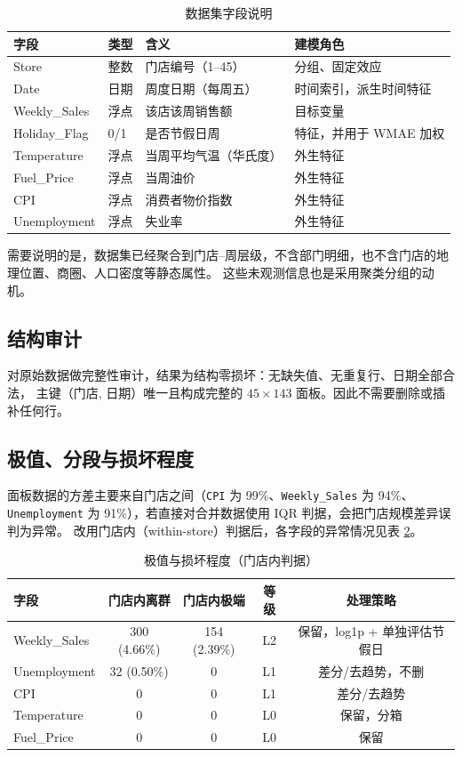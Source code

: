 \documentclass[UTF8,a4paper,11pt]{ctexart}
\begin{document}
\begin{table}[H]
\centering
\caption{数据集字段说明}
\label{tab:fields}
\small
\begin{tabular}{llll}
\toprule
字段 & 类型 & 含义 & 建模角色 \\
\midrule
Store & 整数 & 门店编号（1--45） & 分组、固定效应 \\
Date & 日期 & 周度日期（每周五） & 时间索引，派生时间特征 \\
Weekly\_Sales & 浮点 & 该店该周销售额 & 目标变量 \\
Holiday\_Flag & 0/1 & 是否节假日周 & 特征，并用于 WMAE 加权 \\
Temperature & 浮点 & 当周平均气温（华氏度） & 外生特征 \\
Fuel\_Price & 浮点 & 当周油价 & 外生特征 \\
CPI & 浮点 & 消费者物价指数 & 外生特征 \\
Unemployment & 浮点 & 失业率 & 外生特征 \\
\bottomrule
\end{tabular}
\end{table}

\noindent
需要说明的是，数据集已经聚合到门店--周层级，不含部门明细，也不含门店的地理位置、商圈、人口密度等静态属性。
这些未观测信息也是采用聚类分组的动机。

\subsection{结构审计}

对原始数据做完整性审计，结果为结构零损坏：无缺失值、无重复行、日期全部合法，
主键（门店, 日期）唯一且构成完整的 $45\times143$ 面板。因此不需要删除或插补任何行。

\subsection{极值、分段与损坏程度}

面板数据的方差主要来自门店之间（\texttt{CPI} 为 99\%、\texttt{Weekly\_Sales} 为 94\%、
\texttt{Unemployment} 为 91\%），若直接对合并数据使用 IQR 判据，会把门店规模差异误判为异常。
改用门店内（within-store）判据后，各字段的异常情况见表 \ref{tab:outlier}。

\begin{table}[H]
\centering
\caption{极值与损坏程度（门店内判据）}
\label{tab:outlier}
\small
\begin{tabular}{lcccc}
\toprule
字段 & 门店内离群 & 门店内极端 & 等级 & 处理策略 \\
\midrule
Weekly\_Sales & 300 (4.66\%) & 154 (2.39\%) & L2 & 保留，log1p + 单独评估节假日 \\
Unemployment & 32 (0.50\%) & 0 & L1 & 差分/去趋势，不删 \\
CPI & 0 & 0 & L1 & 差分/去趋势 \\
Temperature & 0 & 0 & L0 & 保留，分箱 \\
Fuel\_Price & 0 & 0 & L0 & 保留 \\
\bottomrule
\end{tabular}
\end{table}
\end{document}
